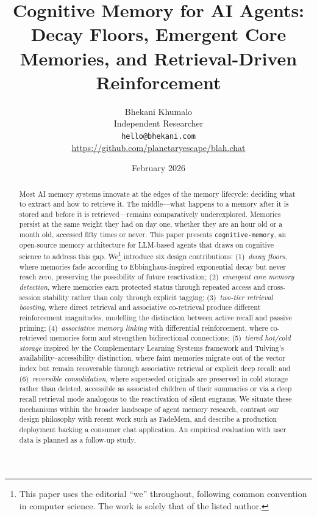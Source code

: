 \documentclass[11pt,a4paper]{article}
\title{Cognitive Memory for AI Agents:\\Decay Floors, Emergent Core Memories, and Retrieval-Driven Reinforcement}
\author{
  Bhekani Khumalo\\
  Independent Researcher\\
  \texttt{hello@bhekani.com}\\
  \url{https://github.com/planetaryescape/blah.chat}
}
\date{February 2026}
\begin{document}
\maketitle

\begin{abstract}
Most AI memory systems innovate at the edges of the memory lifecycle: deciding what to extract and how to retrieve it. The middle---what happens to a memory after it is stored and before it is retrieved---remains comparatively underexplored. Memories persist at the same weight they had on day one, whether they are an hour old or a month old, accessed fifty times or never. This paper presents \texttt{cognitive-memory}, an open-source memory architecture for LLM-based agents that draws on cognitive science to address this gap. We\footnote{This paper uses the editorial ``we'' throughout, following common convention in computer science. The work is solely that of the listed author.} introduce six design contributions: (1)~\emph{decay floors}, where memories fade according to Ebbinghaus-inspired exponential decay but never reach zero, preserving the possibility of future reactivation; (2)~\emph{emergent core memory detection}, where memories earn protected status through repeated access and cross-session stability rather than only through explicit tagging; (3)~\emph{two-tier retrieval boosting}, where direct retrieval and associative co-retrieval produce different reinforcement magnitudes, modelling the distinction between active recall and passive priming; (4)~\emph{associative memory linking} with differential reinforcement, where co-retrieved memories form and strengthen bidirectional connections; (5)~\emph{tiered hot/cold storage} inspired by the Complementary Learning Systems framework and Tulving's availability--accessibility distinction, where faint memories migrate out of the vector index but remain recoverable through associative retrieval or explicit deep recall; and (6)~\emph{reversible consolidation}, where superseded originals are preserved in cold storage rather than deleted, accessible as associated children of their summaries or via a deep recall retrieval mode analogous to the reactivation of silent engrams. We situate these mechanisms within the broader landscape of agent memory research, contrast our design philosophy with recent work such as FadeMem, and describe a production deployment backing a consumer chat application. An empirical evaluation with user data is planned as a follow-up study.
\end{abstract}
\end{document}
